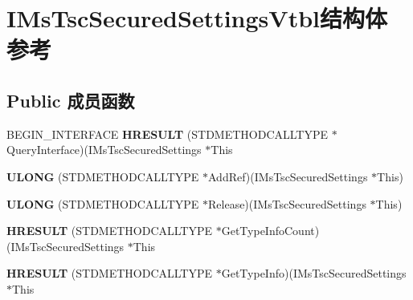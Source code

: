 \hypertarget{struct_i_ms_tsc_secured_settings_vtbl}{}\section{I\+Ms\+Tsc\+Secured\+Settings\+Vtbl结构体 参考}
\label{struct_i_ms_tsc_secured_settings_vtbl}
\subsection*{Public 成员函数}
\begin{DoxyCompactItemize}
\item 
\mbox{\label{struct_i_ms_tsc_secured_settings_vtbl_a796e678e857c2a48535d97b77429e390}} 
B\+E\+G\+I\+N\+\_\+\+I\+N\+T\+E\+R\+F\+A\+CE {\bfseries H\+R\+E\+S\+U\+LT} (S\+T\+D\+M\+E\+T\+H\+O\+D\+C\+A\+L\+L\+T\+Y\+PE $\ast$Query\+Interface)(I\+Ms\+Tsc\+Secured\+Settings $\ast$This
\item 
\mbox{\label{struct_i_ms_tsc_secured_settings_vtbl_aac45183360a8fb8c6b1f30c3fe5a0858}} 
{\bfseries U\+L\+O\+NG} (S\+T\+D\+M\+E\+T\+H\+O\+D\+C\+A\+L\+L\+T\+Y\+PE $\ast$Add\+Ref)(I\+Ms\+Tsc\+Secured\+Settings $\ast$This)
\item 
\mbox{\label{struct_i_ms_tsc_secured_settings_vtbl_ace5abaf3663d0395195922e53b7c6fa5}} 
{\bfseries U\+L\+O\+NG} (S\+T\+D\+M\+E\+T\+H\+O\+D\+C\+A\+L\+L\+T\+Y\+PE $\ast$Release)(I\+Ms\+Tsc\+Secured\+Settings $\ast$This)
\item 
\mbox{\label{struct_i_ms_tsc_secured_settings_vtbl_a6dca1e8722668b2b49984b18bb6246ad}} 
{\bfseries H\+R\+E\+S\+U\+LT} (S\+T\+D\+M\+E\+T\+H\+O\+D\+C\+A\+L\+L\+T\+Y\+PE $\ast$Get\+Type\+Info\+Count)(I\+Ms\+Tsc\+Secured\+Settings $\ast$This
\item 
\mbox{\label{struct_i_ms_tsc_secured_settings_vtbl_aa590d4a5c2e7c535d6c85a04aec6635b}} 
{\bfseries H\+R\+E\+S\+U\+LT} (S\+T\+D\+M\+E\+T\+H\+O\+D\+C\+A\+L\+L\+T\+Y\+PE $\ast$Get\+Type\+Info)(I\+Ms\+Tsc\+Secured\+Settings $\ast$This
\item 
\mbox{\label{struct_i_ms_tsc_secured_settings_vtbl_a13f3ad516912093fa1a1a23f978bceb9}} 

\end{DoxyCompactItemize}
